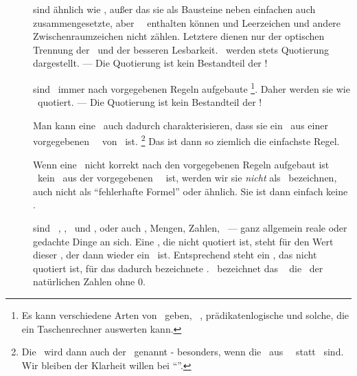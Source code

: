 \begin{description}
	\item [\Symbolketten] sind ähnlich wie \Zeichenketten, außer das sie als Bausteine neben einfachen auch zusammengesetzte, aber \atomare\ \Symbole\ enthalten können und Leerzeichen und andere Zwischenraumzeichen nicht zählen.
	Letztere dienen nur der optischen Trennung der \Symbole\ und der besseren Lesbarkeit.
	\Symbolketten\ werden stets  Quotierung dargestellt.
	--- Die Quotierung ist kein Bestandteil der \Symbolkette!

	\item [\Formeln] \label{def:Formel} sind \hier\ immer nach vorgegebenen Regeln aufgebaute \Symbolketten%
	\footnote{%
		Es kann verschiedene Arten von \Formeln\ geben, \textzB\ \aussagenlogischeF, prädikatenlogische und solche, die ein Taschenrechner auswerten kann.
	}.
	Daher werden sie wie \Symbolketten\ quotiert.
	--- Die Quotierung ist kein Bestandteil der \Symbolkette!

	Man kann eine \Formel\ auch dadurch charakterisieren, dass sie ein \Element\ aus einer vorgegebenen \Menge\ \MtsSprache\ von \Symbolketten\ ist.%
	\footnote{%
		Die \Formel\ wird dann auch  der  \MtsSprache\ genannt - besonders, wenn die \Elemente\ aus \MtsSprache\ \Zeichenketten\ statt \Symbolketten\ sind.
		Wir bleiben der Klarheit willen bei "`\Formel"'.
	}
	Das ist dann so ziemlich die einfachste Regel.

	Wenn eine \Symbolkette\ nicht korrekt nach den vorgegebenen Regeln aufgebaut ist \textbzw\ kein \Element\ aus der vorgegebenen \Menge\ \MtsSprache\ ist, werden wir sie \emph{nicht} als \Formel\ bezeichnen, auch nicht als "`fehlerhafte Formel"' oder ähnlich.
	Sie ist dann einfach keine \Formel.

	\item [\Objekte] sind \textzB\ \Symbole, \Zeichenketten, \Symbolketten\ und \Formeln, oder auch \Aussagen, Mengen, Zahlen, \textusw\ --- ganz allgemein reale oder gedachte Dinge an sich.
	Eine \Formel, die nicht quotiert ist, steht für den Wert dieser \Formel, der dann wieder ein \Objekt\ ist.
	Entsprechend steht ein \Symbol, das nicht quotiert ist, für das dadurch bezeichnete \Objekt.
	\textZB\ bezeichnet das \Symbol\ \chrqt{\MtsIN} die \Menge\ \MtsIN der natürlichen Zahlen ohne 0.

\end{description}

